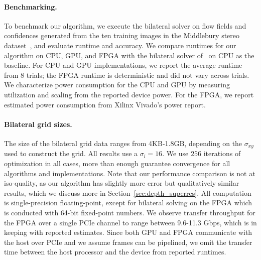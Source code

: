 \paragraph{Benchmarking.} To benchmark our algorithm, we execute the bilateral solver on flow fields and confidences generated from the ten training images in the Middlebury stereo dataset~\cite{middlebury-data}, and evaluate runtime and accuracy.
We compare runtimes for our algorithm on CPU, GPU, and FPGA with the bilateral solver of~\cite{BarronPoole2016} on CPU as the baseline.
For CPU and GPU implementations, we report the average runtime from $8$ trials; the FPGA runtime is deterministic and did not vary across trials.
We characterize power consumption for the CPU and GPU by measuring utilization and scaling from the reported device power.
For the FPGA, we report estimated power consumption from Xilinx Vivado's power report.

\paragraph{Bilateral grid sizes.} The size of the bilateral grid data ranges from 4KB-1.8GB, depending on the $\sigma_{xy}$ used to construct the grid.
All results use a $\sigma_{l} = 16$.
We use $256$ iterations of optimization in all cases, more than enough guarantee convergence for all algorithms and implementations.
Note that our performance comparison is not at iso-quality, as our algorithm has slightly more error but qualitatively similar results, which we discuss more in Section~\ref{sec:depth_superres}.
All computation is single-precision floating-point, except for bilateral solving on the FPGA which is conducted with 64-bit fixed-point numbers.
We observe transfer throughput for the FPGA over a single PCIe channel to range between 9.6-11.3 Gbps, which is in keeping with reported estimates.
Since both GPU and FPGA communicate with the host over PCIe and we assume frames can be pipelined, we omit the transfer time between the host processor and the device from reported runtimes.

